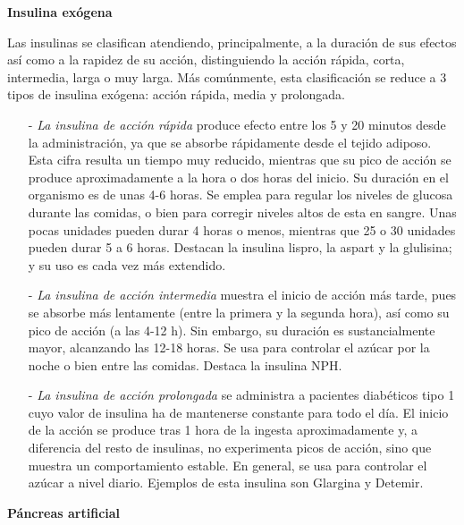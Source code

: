 \textbf{Insulina exógena} 

Las insulinas se clasifican atendiendo, principalmente, a la duración de sus efectos así como a la rapidez de su acción, distinguiendo la acción rápida, corta, intermedia, larga o muy larga. Más comúnmente, esta clasificación se reduce a 3 tipos de insulina exógena: acción rápida, media y prolongada. \label{sec:ins_ex}

\begin{enumerate}
    \item[-] \textit{La insulina de acción rápida} produce efecto entre los 5 y 20 minutos desde la administración, ya que se absorbe rápidamente desde el tejido adiposo. Esta cifra resulta un tiempo muy reducido, mientras que su pico de acción se produce aproximadamente a la hora o dos horas del inicio. Su duración en el organismo es de unas 4-6 horas. Se emplea para regular los niveles de glucosa durante las comidas, o bien para corregir niveles altos de esta en sangre.
    Unas pocas unidades pueden durar 4 horas o menos, mientras que 25 o 30 unidades pueden durar 5 a 6 horas. Destacan la insulina lispro, la aspart y la glulisina; y su uso es cada vez más extendido. \label{sec:ins_rap}
    \item[-] \textit{La insulina de acción intermedia} muestra el inicio de acción más tarde, pues se absorbe más lentamente (entre la primera y la segunda hora), así como su pico de acción (a las 4-12 h). Sin embargo, su duración es sustancialmente mayor, alcanzando las 12-18 horas. Se usa para controlar el azúcar por la noche o bien entre las comidas. Destaca la insulina NPH.
    \item[-] \textit{La insulina de acción prolongada} se administra a pacientes diabéticos tipo 1 cuyo valor de insulina ha de mantenerse constante para todo el día. El inicio de la acción se produce tras 1 hora de la ingesta aproximadamente y, a diferencia del resto de insulinas, no experimenta picos de acción, sino que muestra un comportamiento estable. En general, se usa para controlar el azúcar a nivel diario. Ejemplos de esta insulina son Glargina y Detemir. \label{sec:ins_prol}
\end{enumerate}

\textbf{Páncreas artificial} 
\label{sec:pancreas_artificial}

